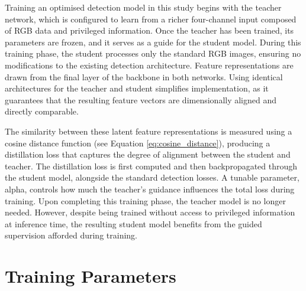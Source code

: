 Training an optimised detection model in this study begins with the teacher network, which is configured to learn from a richer four-channel input composed of RGB data and privileged information. Once the teacher has been trained, its parameters are frozen, and it serves as a guide for the student model. During this training phase, the student processes only the standard RGB images, ensuring no modifications to the existing detection architecture. Feature representations are drawn from the final layer of the backbone in both networks. Using identical architectures for the teacher and student simplifies implementation, as it guarantees that the resulting feature vectors are dimensionally aligned and directly comparable.

The similarity between these latent feature representations is measured using a cosine distance function (see Equation \ref{eq:cosine_distance}), producing a distillation loss that captures the degree of alignment between the student and teacher. The distillation loss is first computed and then backpropagated through the student model, alongside the standard detection losses. A tunable parameter, \gls{alpha}, controls how much the teacher’s guidance influences the total loss during training. Upon completing this training phase, the teacher model is no longer needed. However, despite being trained without access to privileged information at inference time, the resulting student model benefits from the guided supervision afforded during training.

\section{Training Parameters}
\label{sec:4_training_params}

